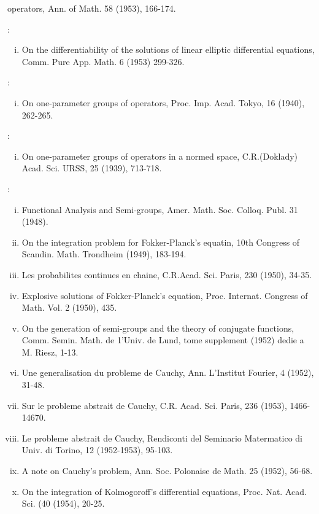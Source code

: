 \begin{thebibliography}{99}
\begin{enumerate}[(i)]
  operators, Ann. of Math. 58 (1953), 166-174. 
 \end{enumerate}
: 
 \begin{enumerate}[(i)]
 \item On the differentiability of the solutions of linear elliptic
  differential equations, Comm. Pure App. Math. 6 (1953) 299-326. 
 \end{enumerate}
: 
 \begin{enumerate}[(i)]
 \item On one-parameter groups of operators, Proc. Imp. Acad. Tokyo,
  16 (1940), 262-265. 
 \end{enumerate}
: 
 \begin{enumerate}[(i)]
 \item On one-parameter groups of operators in a normed space,
  C.R.(Doklady) Acad. Sci. URSS, 25 (1939), 713-718. 
 \end{enumerate}
:\pageoriginale 
 \begin{enumerate}[(i)]
 \item Functional Analysis and Semi-groups,
  Amer. Math. Soc. Colloq. Publ. 31 (1948). 
 \item On the integration problem for Fokker-Planck's equatin, 10th
  Congress of Scandin. Math. Trondheim (1949), 183-194. 
 \item Les probabilites continues en chaine, C.R.Acad. Sci. Paris,
  230 (1950), 34-35. 
 \item Explosive solutions of Fokker-Planck's equation,
  Proc. Internat. Congress of Math. Vol. 2 (1950), 435. 
 \item On the generation of semi-groups and the theory of conjugate
  functions, Comm. Semin. Math. de 1'Univ. de Lund, tome supplement
  (1952) dedie a M. Riesz, 1-13. 
 \item Une generalisation du probleme de Cauchy, Ann. L'Institut
  Fourier, 4 (1952), 31-48. 
 \item Sur le probleme abstrait de Cauchy, C.R. Acad. Sci. Paris,
  236 (1953), 1466-14670. 
 \item Le probleme abstrait de Cauchy, Rendiconti del Seminario
  Matermatico di Univ. di Torino, 12 (1952-1953), 95-103. 
 \item A note on Cauchy's problem, Ann. Soc. Polonaise de Math. 25
  (1952), 56-68. 
 \item On the integration of Kolmogoroff's differential equations,
  Proc. Nat. Acad. Sci. (40 (1954), 20-25. 

\end{enumerate}
\end{thebibliography}
